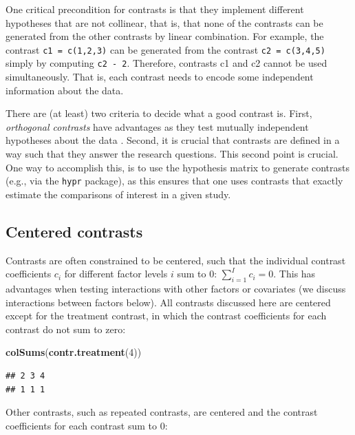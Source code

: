 \documentclass[12pt,]{krantz}
\newenvironment{Shaded}{\begin{snugshade}}{\end{snugshade}}
\newcommand{\DecValTok}[1]{\textcolor[rgb]{0.00,0.00,0.81}{#1}}
\newcommand{\KeywordTok}[1]{\textcolor[rgb]{0.13,0.29,0.53}{\textbf{#1}}}
\newcommand{\NormalTok}[1]{#1}
\theoremstyle{definition}
\theoremstyle{definition}
\theoremstyle{definition}
\theoremstyle{remark}
\begin{document}
One critical precondition for contrasts is that they implement different hypotheses that are not collinear, that is, that none of the contrasts can be generated from the other contrasts by linear combination. For example, the contrast \texttt{c1\ =\ c(1,2,3)} can be generated from the contrast \texttt{c2\ =\ c(3,4,5)} simply by computing \texttt{c2\ -\ 2}. Therefore, contrasts c1 and c2 cannot be used simultaneously. That is, each contrast needs to encode some independent information about the data.

There are (at least) two criteria to decide what a good contrast is. First, \textit{orthogonal contrasts} have advantages as they test mutually independent hypotheses about the data \citep[see][section 6.2.5, p.~91 for a detailed explanation of orthogonality]{dobson2011introduction}. Second, it is crucial that contrasts are defined in a way such that they answer the research questions. This second point is crucial. One way to accomplish this, is to use the hypothesis matrix to generate contrasts (e.g., via the \texttt{hypr} package), as this ensures that one uses contrasts that exactly estimate the comparisons of interest in a given study.

\hypertarget{centered-contrasts}{%
\subsection{Centered contrasts}\label{centered-contrasts}}

Contrasts are often constrained to be centered, such that the individual contrast coefficients \(c_i\) for different factor levels \(i\) sum to \(0\): \(\sum_{i=1}^I c_i = 0\). This has advantages when testing interactions with other factors or covariates (we discuss interactions between factors below).
All contrasts discussed here are centered except for the treatment contrast, in which the contrast coefficients for each contrast do not sum to zero:

\begin{Shaded}
\begin{Highlighting}[]
\KeywordTok{colSums}\NormalTok{(}\KeywordTok{contr.treatment}\NormalTok{(}\DecValTok{4}\NormalTok{))}
\end{Highlighting}
\end{Shaded}

\begin{verbatim}
## 2 3 4 
## 1 1 1
\end{verbatim}

Other contrasts, such as repeated contrasts, are centered and the contrast coefficients for each contrast sum to \(0\):
\end{document}
